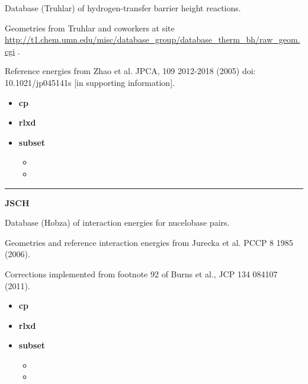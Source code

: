 \documentclass[letterpaper,10pt,english]{sphinxmanual}
\begin{document}
\begin{DUlineblock}{0em}
\item[] Database (Truhlar) of hydrogen-transfer barrier height reactions.
\item[] Geometries from Truhlar and coworkers at site \href{http://t1.chem.umn.edu/misc/database\_group/database\_therm\_bh/raw\_geom.cgi}{http://t1.chem.umn.edu/misc/database\_group/database\_therm\_bh/raw\_geom.cgi} .
\item[] Reference energies from Zhao et al. JPCA, 109 2012-2018 (2005) doi: 10.1021/jp045141s {[}in supporting information{]}.
\end{DUlineblock}
\begin{itemize}
\item {} 
\textbf{cp}  

\item {} 
\textbf{rlxd} 

\item {} 
\textbf{subset}
\begin{itemize}
\item {} 

\item {} 

\end{itemize}

\end{itemize}


\bigskip\hrule{}\bigskip

\label{index:module-JSCH}
\textbf{JSCH}

\begin{DUlineblock}{0em}
\item[] Database (Hobza) of interaction energies for nucelobase pairs.
\item[] Geometries and reference interaction energies from Jurecka et al. PCCP 8 1985 (2006).
\item[] Corrections implemented from footnote 92 of Burns et al., JCP 134 084107 (2011).
\end{DUlineblock}
\begin{itemize}
\item {} 
\textbf{cp}   \textbar{}\textbar{} 

\item {} 
\textbf{rlxd} 

\item {} 
\textbf{subset}
\begin{itemize}
\item {} 

\item {} 

\end{itemize}

\end{itemize}
\end{document}
